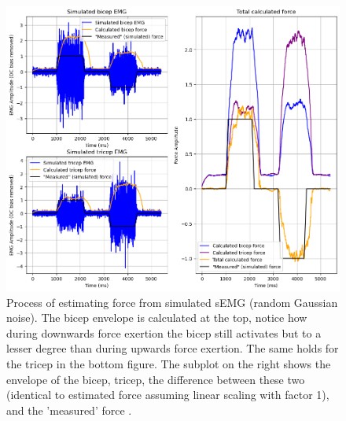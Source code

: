 \begin{figure}[h!t]
	\begin{center}
		\includegraphics[width=1.0\columnwidth]{images/force_simulation.png}
	\end{center}
	\caption{Process of estimating force from simulated sEMG (random Gaussian noise). The bicep envelope is calculated at the top, notice how during downwards force exertion the bicep still activates but to a lesser degree than during upwards force exertion. The same holds for the tricep in the bottom figure. The subplot on the right shows the envelope of the bicep, tricep, the difference between these two (identical to estimated force assuming linear scaling with factor 1), and the 'measured' force .}
	\label{fig:force_simulation}
\end{figure}

